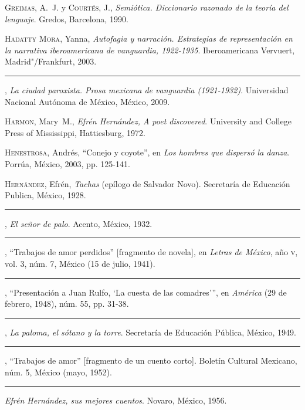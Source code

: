 \documentclass[14pt,twoside,final]{extbook} %
\begin{document}
\textsc{Greimas}, A.~J. y \textsc{Courtés}, J., \emph{Semiótica. Diccionario razonado de la teoría del lenguaje}. Gredos, Barcelona, 1990.\label{bib:greimas1990}

\textsc{Hadatty Mora}, Yanna, \emph{Autofagia y narración. Estrategias de representación en la narrativa iberoamericana de vanguardia, 1922-1935}. Iberoamericana Vervuert, Madrid"/Frankfurt, 2003.\label{bib:hadatty2003}

\rule{1cm}{0.4pt}, \emph{La ciudad paroxista. Prosa mexicana de vanguardia (1921-1932)}. Universidad Nacional Autónoma de México, México, 2009.\label{bib:hadatty2009}

\textsc{Harmon}, Mary~M., \emph{Efrén Hernández, A poet discovered}. University and College Press of Mississippi, Hattiesburg, 1972.\label{bib:harmon1972}

\textsc{Henestrosa}, Andrés, ``Conejo y coyote'', en \emph{Los hombres que dispersó la danza}. Porrúa, México, 2003, pp. 125-141.\label{bib:henestroza2003}

\textsc{Hernández}, Efrén, \emph{Tachas} (epílogo de Salvador Novo). Secretaría de Educación Publica, México, 1928.\label{bib:hernandez1928}

\rule{1cm}{0.4pt}, \emph{El señor de palo}. Acento, México, 1932.\label{bib:hernandez1932}

\rule{1cm}{0.4pt}, ``Trabajos de amor perdidos'' [fragmento de novela], en \emph{Letras de México}, año \textsc{v}, vol. 3, núm. 7, México (15 de julio, 1941).\label{bib:hernandez1941}

\rule{1cm}{0.4pt}, ``Presentación a Juan Rulfo, `La cuesta de las comadres'{}'', en \emph{América} (29 de febrero, 1948), núm. 55, pp. 31-38.\label{bib:hernandez1948}

\rule{1cm}{0.4pt}, \emph{La paloma, el sótano y la torre}. Secretaría de Educación Pública, México, 1949.\label{bib:hernandez1949}

\rule{1cm}{0.4pt}, ``Trabajos de amor'' [fragmento de un cuento corto]. Boletín Cultural Mexicano, núm. 5, México (mayo, 1952).\label{bib:hernandez1952}

\rule{1cm}{0.4pt} \emph{Efrén Hernández, sus mejores cuentos}. Novaro, México, 1956.\label{bib:hernandez1956}
\end{document}
